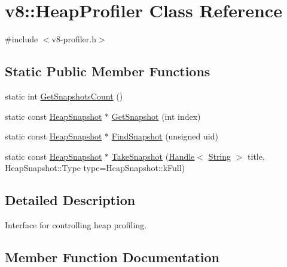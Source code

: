 \hypertarget{classv8_1_1_heap_profiler}{}\section{v8\+:\+:Heap\+Profiler Class Reference}
\label{classv8_1_1_heap_profiler}


{\ttfamily \#include $<$v8-\/profiler.\+h$>$}

\subsection*{Static Public Member Functions}
\begin{DoxyCompactItemize}
\item 
static int \hyperlink{classv8_1_1_heap_profiler_a739a665268bba6e640890464ccb60d26}{Get\+Snapshots\+Count} ()
\item 
static const \hyperlink{classv8_1_1_heap_snapshot}{Heap\+Snapshot} $\ast$ \hyperlink{classv8_1_1_heap_profiler_ad547f406908880cc7dc0453fe83cc216}{Get\+Snapshot} (int index)
\item 
static const \hyperlink{classv8_1_1_heap_snapshot}{Heap\+Snapshot} $\ast$ \hyperlink{classv8_1_1_heap_profiler_a1f77545176060f21239bd1a78e3967a7}{Find\+Snapshot} (unsigned uid)
\item 
static const \hyperlink{classv8_1_1_heap_snapshot}{Heap\+Snapshot} $\ast$ \hyperlink{classv8_1_1_heap_profiler_a015cede09e3ca173cff13106ccb91c5b}{Take\+Snapshot} (\hyperlink{classv8_1_1_handle}{Handle}$<$ \hyperlink{classv8_1_1_string}{String} $>$ title, Heap\+Snapshot\+::\+Type type=Heap\+Snapshot\+::k\+Full)
\end{DoxyCompactItemize}


\subsection{Detailed Description}
Interface for controlling heap profiling. 

\subsection{Member Function Documentation}
\hypertarget{classv8_1_1_heap_profiler_a1f77545176060f21239bd1a78e3967a7}{}
